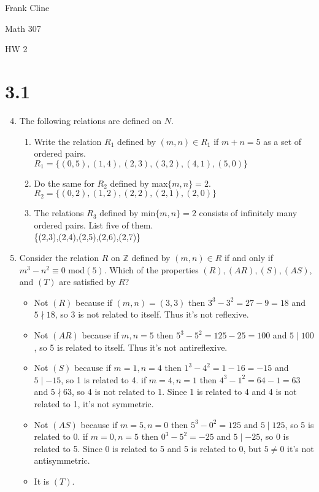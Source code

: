 \documentclass{article}
\newcommand{\Z}{\mathbb{Z}}
\begin{document}
\onehalfspacing
\hfill Frank Cline

\hfill Math 307

\hfill HW 2


\section*{3.1}

\begin{enumerate}
\setcounter{enumi}{3}
\item The following relations are defined on $N$.
	\begin{enumerate}
	\item Write the relation $R_1$ defined by $(m,n)\in R_1$ if $m+n=5$ as a set of ordered pairs.\\
	$R_1=\{(0,5),(1,4),(2,3),(3,2),(4,1),(5,0)\}$
	\item Do the same for $R_2$ defined by max$\{m,n\}=2$.\\
	$R_2=\{(0,2),(1,2),(2,2),(2,1),(2,0)\}$
	\item The relations $R_3$ defined by min$\{m,n\}=2$ consists of infinitely many ordered pairs. List five 	of them.\\
	\{(2,3),(2,4),(2,5),(2,6),(2,7)\}
	\end{enumerate}
\setcounter{enumi}{5}
\item Consider the relation $R$ on $\Z$ defined by $(m,n)\in R$ if and only if $m^3-n^2\equiv 0$ mod$(5)$. Which of the properties $(R),(AR),(S),(AS)$, and $(T)$ are satisfied by $R$?
	\begin{itemize}
	\item Not $(R)$ because if $(m,n)=(3,3)$ then $3^3-3^2=27-9=18$ and $5\nmid18$, so 3 is not related to 	itself. Thus it's not reflexive.
	\item Not $(AR)$ because if $m,n=5$ then $5^3-5^2=125-25=100$ and $5\mid100$, so 5 is related to 
	itself. Thus it's not antireflexive.
	\item Not $(S)$ because if $m=1,n=4$ then $1^3-4^2=1-16=-15$ and $5\mid-15$, so 1 is related to 4.
	if $m=4,n=1$ then $4^3-1^2=64-1=63$ and $5\nmid63$, so 4 is not related to 1. Since 1 is related to 4 
	and 4 is not related to 1, it's not symmetric.
	\item Not $(AS)$ because if $m=5,n=0$ then $5^3-0^2=125$ and $5\mid125$, so 5 is related to 0.
	if $m=0,n=5$ then $0^3-5^2=-25$ and $5\mid-25$, so 0 is related to 5. Since 0 is related to 5 and 5 is 
	related to 0, but $5\not=0$ it's not antisymmetric.
	\item It is $(T)$.
	\end{itemize}
\end{enumerate}
\end{document}
